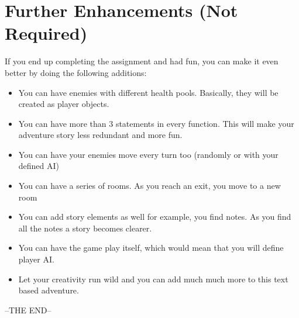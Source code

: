 \documentclass[a4paper,12pt]{article}
\begin{document}
\section{Further Enhancements (Not Required)}
If you end up completing the assignment and had fun, you can make it even better by doing the following additions:
\begin{itemize}
\item You can have enemies with different health pools. Basically, they will be created as player objects.
\item You can have more than 3 statements in every function. This will make your adventure story less redundant and more fun.
\item You can have your enemies move every turn too (randomly or with your defined AI)
\item You can have a series of rooms. As you reach an exit, you move to a new room
\item You can add story elements as well for example, you find notes. As you find all the notes a story becomes clearer.
\item You can have the game play itself, which would mean that you will define player AI.
\item Let your creativity run wild and you can add much much more to this text based adventure.
\end{itemize}

\begin{center}
  --THE END--
\end{center}
\end{document}
